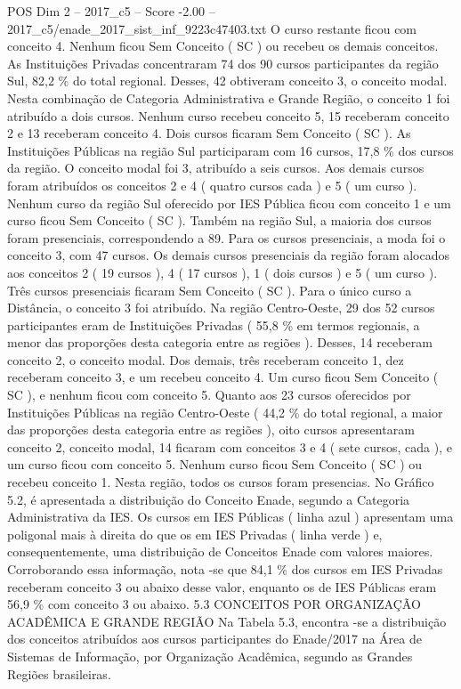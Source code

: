 \begin{textsample}{POS Dim 2 – 2017\_c5 – Score -2.00 – 2017\_c5/enade\_2017\_sist\_inf\_9223c47403.txt}
O curso restante ficou com conceito 4.
Nenhum ficou Sem Conceito ( SC ) ou recebeu os demais conceitos.
As Instituições Privadas concentraram 74 dos 90 cursos participantes da região Sul, 82,2 \% do total regional.
Desses, 42 obtiveram conceito 3, o conceito modal.
Nesta combinação de Categoria Administrativa e Grande Região, o conceito 1 foi atribuído a dois cursos.
Nenhum curso recebeu conceito 5, 15 receberam conceito 2 e 13 receberam conceito 4.
Dois cursos ficaram Sem Conceito ( SC ).
As Instituições Públicas na região Sul participaram com 16 cursos, 17,8 \% dos cursos da região.
O conceito modal foi 3, atribuído a seis cursos.
Aos demais cursos foram atribuídos os conceitos 2 e 4 ( quatro cursos cada ) e 5 ( um curso ).
Nenhum curso da região Sul oferecido por IES Pública ficou com conceito 1 e um curso ficou Sem Conceito ( SC ).
Também na região Sul, a maioria dos cursos foram presenciais, correspondendo a 89.
Para os cursos presenciais, a moda foi o conceito 3, com 47 cursos.
Os demais cursos presenciais da região foram alocados aos conceitos 2 ( 19 cursos ), 4 ( 17 cursos ), 1 ( dois cursos ) e 5 ( um curso ).
Três cursos presenciais ficaram Sem Conceito ( SC ).
Para o único curso a Distância, o conceito 3 foi atribuído.
Na região Centro-Oeste, 29 dos 52 cursos participantes eram de Instituições Privadas ( 55,8 \% em termos regionais, a menor das proporções desta categoria entre as regiões ).
Desses, 14 receberam conceito 2, o conceito modal.
Dos demais, três receberam conceito 1, dez receberam conceito 3, e um recebeu conceito 4.
Um curso ficou Sem Conceito ( SC ), e nenhum ficou com conceito 5.
Quanto aos 23 cursos oferecidos por Instituições Públicas na região Centro-Oeste ( 44,2 \% do total regional, a maior das proporções desta categoria entre as regiões ), oito cursos apresentaram conceito 2, conceito modal, 14 ficaram com conceitos 3 e 4 ( sete cursos, cada ), e um curso ficou com conceito 5.
Nenhum curso ficou Sem Conceito ( SC ) ou recebeu conceito 1.
Nesta região, todos os cursos foram presencias.
No Gráfico 5.2, é apresentada a distribuição do Conceito Enade, segundo a Categoria Administrativa da IES.
Os cursos em IES Públicas ( linha azul ) apresentam uma poligonal mais à direita do que os em IES Privadas ( linha verde ) e, consequentemente, uma distribuição de Conceitos Enade com valores maiores.
Corroborando essa informação, nota -se que 84,1 \% dos cursos em IES Privadas receberam conceito 3 ou abaixo desse valor, enquanto os de IES Públicas eram 56,9 \% com conceito 3 ou abaixo. 5.3 CONCEITOS POR ORGANIZAÇÃO ACADÊMICA E GRANDE REGIÃO Na Tabela 5.3, encontra -se a distribuição dos conceitos atribuídos aos cursos participantes do Enade/2017 na Área de Sistemas de Informação, por Organização Acadêmica, segundo as Grandes Regiões brasileiras.

\end{textsample}
